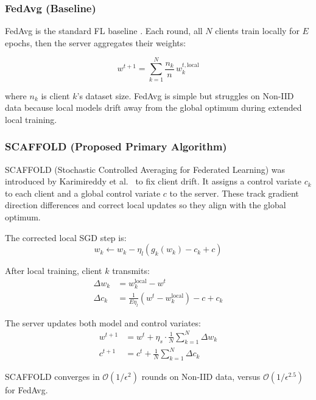 \documentclass[12pt, a4paper]{article}
\begin{document}
\subsubsection{FedAvg (Baseline)}

FedAvg is the standard FL baseline \cite{p6}. Each round, all $N$ clients train locally for $E$ epochs, then the server aggregates their weights:

\begin{equation}
w^{t+1} = \sum_{k=1}^{N} \frac{n_k}{n} \, w_k^{t, \text{local}}
\label{eq:fedavg}
\end{equation}

where $n_k$ is client $k$'s dataset size. FedAvg is simple but struggles on Non-IID data because local models drift away from the global optimum during extended local training.

\subsubsection{SCAFFOLD (Proposed Primary Algorithm)}

SCAFFOLD (Stochastic Controlled Averaging for Federated Learning) was introduced by Karimireddy et al.~\cite{p5} to fix client drift. It assigns a control variate $c_k$ to each client and a global control variate $c$ to the server. These track gradient direction differences and correct local updates so they align with the global optimum.

The corrected local SGD step is:
\begin{equation}
w_k \leftarrow w_k - \eta_l \left( g_k(w_k) - c_k + c \right)
\label{eq:scaffold_step}
\end{equation}

After local training, client $k$ transmits:
\begin{align}
\Delta w_k &= w_k^{\text{local}} - w^t \\
\Delta c_k &= \frac{1}{E \eta_l} \left( w^t - w_k^{\text{local}} \right) - c + c_k
\end{align}

The server updates both model and control variates:
\begin{align}
w^{t+1} &= w^t + \eta_s \cdot \frac{1}{N} \sum_{k=1}^{N} \Delta w_k \\
c^{t+1} &= c^t + \frac{1}{N} \sum_{k=1}^{N} \Delta c_k
\end{align}

SCAFFOLD converges in $\mathcal{O}(1/\epsilon^2)$ rounds on Non-IID data, versus $\mathcal{O}(1/\epsilon^{2.5})$ for FedAvg.
\end{document}
